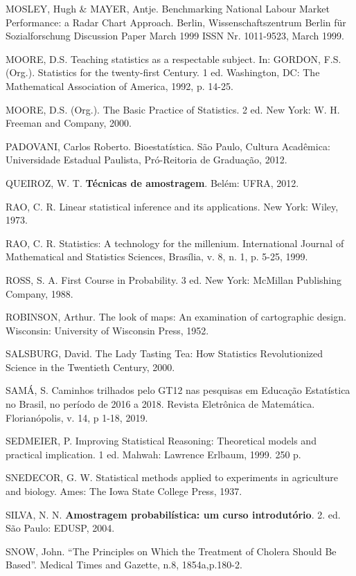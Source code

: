 MOSLEY, Hugh \& MAYER, Antje. Benchmarking National Labour Market Performance: a Radar Chart Approach. Berlin, Wissenschaftszentrum Berlin für Sozialforschung Discussion Paper March 1999 ISSN Nr. 1011-9523, March 1999.\vskip0.3cm

MOORE, D.S. Teaching statistics as a respectable subject. In: GORDON, F.S. (Org.). Statistics for the twenty-first Century. 1 ed. Washington, DC: The Mathematical Association of America, 1992, p. 14-25.\vskip0.3cm

MOORE, D.S. (Org.). The Basic Practice of Statistics. 2 ed. New York: W. H. Freeman and Company, 2000. \vskip0.3cm

PADOVANI, Carlos Roberto. Bioestatística. São Paulo, Cultura A\-ca\-dê\-mi\-ca: Universidade Estadual Paulista, Pró-Reitoria de Graduação, 2012.\vskip0.3cm

QUEIROZ, W. T. \textbf{Técnicas de amostragem}. Belém: UFRA, 2012. \vskip0.3cm

RAO, C. R. Linear statistical inference and its applications. New York: Wiley, 1973.\vskip0.3cm

RAO, C. R. Statistics: A technology for the millenium. International Journal of Mathematical and Statistics Sciences, Brasília, v. 8, n. 1, p. 5-25, 1999.\vskip0.3cm

ROSS, S. A. First Course in Probability. 3 ed. New York: McMillan Publishing Company, 1988.\vskip0.3cm

ROBINSON, Arthur. The look of maps: An examination of cartographic design. Wisconsin: University of Wisconsin Press, 1952.\vskip0.3cm

SALSBURG, David. The Lady Tasting Tea: How Statistics Revolutionized Science in the Twentieth Century, 2000.\vskip0.3cm

SAMÁ, S. Caminhos trilhados pelo GT12 nas pesquisas em Educação Estatística no Brasil, no período de 2016 a 2018. Revista Eletrônica de Matemática. Florianópolis, v. 14, p 1-18, 2019.\vskip0.3cm

SEDMEIER, P. Improving Statistical Reasoning: Theoretical models and practical implication. 1 ed. Mahwah: Lawrence Erlbaum, 1999. 250 p.\vskip0.3cm

\newpage
SNEDECOR, G. W. Statistical methods applied to experiments in agriculture and biology. Ames: The Iowa State College Press, 1937. \vskip0.3cm

SILVA, N. N. \textbf{Amostragem probabilística: um curso introdutório}. 2. ed. São Paulo: EDUSP, 2004. \vskip0.3cm

SNOW, John. “The Principles on Which the Treatment of Cholera Should Be Based”. Medical Times and Gazette, n.8, 1854a,p.180-2.\vskip0.3cm

